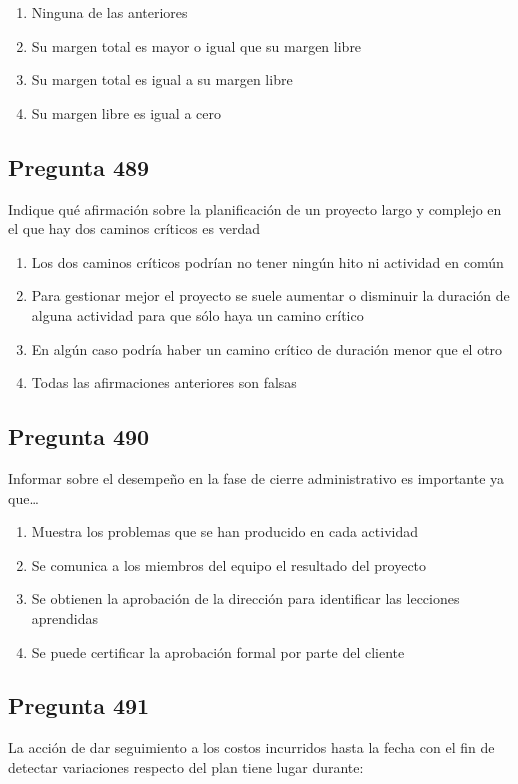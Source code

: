 \documentclass[11pt,a4paper]{article}
\begin{document}
\begin{enumerate}[label=\alph*)]
  \item Ninguna de las anteriores
  \item Su margen total es mayor o igual que su margen libre
  \item Su margen total es igual a su margen libre
  \item Su margen libre es igual a cero
\end{enumerate}

\subsection*{Pregunta 489}
Indique qué afirmación sobre la planificación de un proyecto largo y complejo en el que hay dos caminos críticos es verdad

\begin{enumerate}[label=\alph*)]
  \item Los dos caminos críticos podrían no tener ningún hito ni actividad en común
  \item Para gestionar mejor el proyecto se suele aumentar o disminuir la duración de alguna actividad para que sólo haya un camino crítico
  \item En algún caso podría haber un camino crítico de duración menor que el otro
  \item Todas las afirmaciones anteriores son falsas
\end{enumerate}

\subsection*{Pregunta 490}
Informar sobre el desempeño en la fase de cierre administrativo es importante ya que…

\begin{enumerate}[label=\alph*)]
  \item Muestra los problemas que se han producido en cada actividad
  \item Se comunica a los miembros del equipo el resultado del proyecto
  \item Se obtienen la aprobación de la dirección para identificar las lecciones aprendidas
  \item Se puede certificar la aprobación formal por parte del cliente
\end{enumerate}

\subsection*{Pregunta 491}
La acción de dar seguimiento a los costos incurridos hasta la fecha con el fin de detectar variaciones respecto del plan tiene lugar durante:
\end{document}

